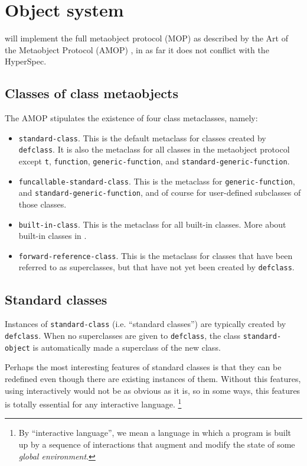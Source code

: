 \chapter{Object system}

\sysname{} will implement the full metaobject protocol (MOP) as
described by the Art of the Metaobject Protocol (AMOP)
\cite{Kiczales:1991:AMP:574212}, in as far it does not conflict with
the HyperSpec.

\section{Classes of class metaobjects}

The AMOP stipulates the existence of four class metaclasses, namely:

\begin{itemize}
\item \texttt{standard-class}.  This is the default metaclass for classes
  created by \texttt{defclass}.  It is also the metaclass for all
  classes in the metaobject protocol except \texttt{t},
  \texttt{function}, \texttt{generic-function}, and
  \texttt{standard-generic-function}. 
\item \texttt{funcallable-standard-class}.  This is the metaclass for
  \texttt{generic-function}, and \texttt{standard-generic-function},
  and of course for user-defined subclasses of those classes. 
\item \texttt{built-in-class}.  This is the metaclass for all built-in
  classes.  More about built-in classes in
  . 
\item \texttt{forward-reference-class}.  This is the metaclass for
  classes that have been referred to as superclasses, but that have
  not yet been created by \texttt{defclass}.
\end{itemize}

\section{Standard classes}
\label{object-system-standard-classes}

Instances of \texttt{standard-class} (i.e. ``standard classes'') are
typically created by \texttt{defclass}.  When no superclasses are
given to \texttt{defclass}, the class \texttt{standard-object} is
automatically made a superclass of the new class.  

Perhaps the most interesting features of standard classes is that they
can be redefined even though there are existing instances of them.
Without this features, using \cl{} interactively would not be as
obvious as it is, so in some ways, this features is totally essential
for any interactive language.%
\footnote{By ``interactive language'', we mean a language in which a
  program is built up by a sequence of interactions that augment and
  modify the state of some \emph{global environment}.}

